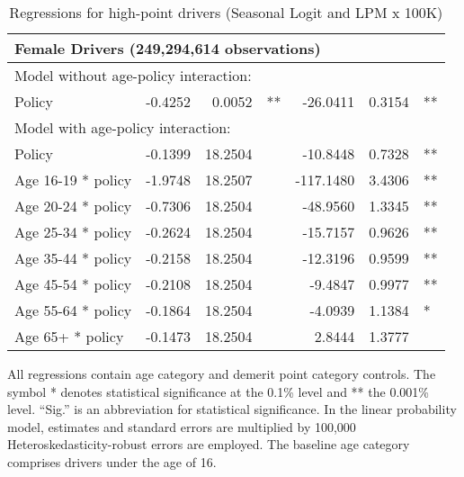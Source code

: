 \begin{table}
\begin{tabular}{l r r l r r l}
\hline 

\multicolumn{7}{l}{\textbf{Female Drivers} (249,294,614 observations)} \\ 

\hline
\multicolumn{7}{l}{Model without age-policy interaction: } \\ 
Policy                   &  -0.4252        &  0.0052       &   **       &  -26.0411        &  0.3154       &   **       \\ 
\hline
\multicolumn{7}{l}{Model with age-policy interaction: } \\ 
Policy                   &  -0.1399        &  18.2504       &            &  -10.8448        &  0.7328       &   **       \\ 
Age 16-19 * policy   &  -1.9748        &  18.2507       &            &  -117.1480        &  3.4306       &   **       \\ 
Age 20-24 * policy   &  -0.7306        &  18.2504       &            &  -48.9560        &  1.3345       &   **       \\ 
Age 25-34 * policy   &  -0.2624        &  18.2504       &            &  -15.7157        &  0.9626       &   **       \\ 
Age 35-44 * policy   &  -0.2158        &  18.2504       &            &  -12.3196        &  0.9599       &   **       \\ 
Age 45-54 * policy   &  -0.2108        &  18.2504       &            &  -9.4847        &  0.9977       &   **       \\ 
Age 55-64 * policy   &  -0.1864        &  18.2504       &            &  -4.0939        &  1.1384       &    *       \\ 
Age 65+ * policy   &  -0.1473        &  18.2504       &            &  2.8444        &  1.3777       &            \\ 

\hline 

\end{tabular} 
\caption{Regressions for high-point drivers (Seasonal Logit and LPM x 100K)} 
All regressions contain age category and demerit point category controls. 
The symbol * denotes statistical significance at the 0.1\% level 
and ** the 0.001\% level. 
``Sig.'' is an abbreviation for statistical significance. 
In the linear probability model, estimates and standard errors are multiplied by 100,000  
Heteroskedasticity-robust errors are employed. 
The baseline age category comprises drivers under the age of 16. 
\label{tab:seas_Logit_vs_LPMx100K_high_pt_regs} 
\end{table} 
 
